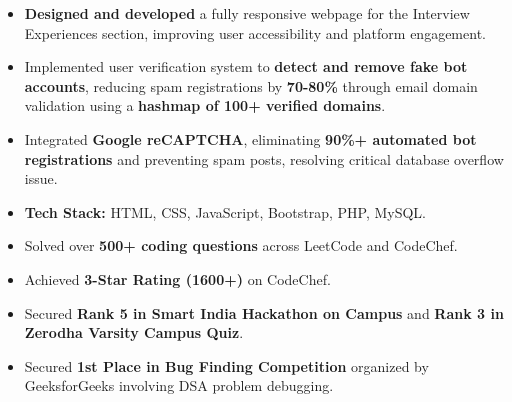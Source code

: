 \documentclass[10pt,a4paper,ragged2e]{altacv}
\begin{document}
\begin{itemize}
\item \textbf{Designed and developed} a fully responsive webpage for the Interview Experiences section, improving user accessibility and platform engagement.
\smallskip
\item Implemented user verification system to \textbf{detect and remove fake bot accounts}, reducing spam registrations by \textbf{70-80\%} through email domain validation using a \textbf{hashmap of 100+ verified domains}.
\smallskip
\item Integrated \textbf{Google reCAPTCHA}, eliminating \textbf{90\%+ automated bot registrations} and preventing spam posts, resolving critical database overflow issue.
\smallskip
\item \textbf{Tech Stack:} HTML, CSS, JavaScript, Bootstrap, PHP, MySQL.
\end{itemize}

\divider

\smallskip
\begin{itemize}
\item Solved over \textbf{500+ coding questions} across LeetCode and CodeChef.
\smallskip
\item Achieved \textbf{3-Star Rating (1600+)} on CodeChef.
\smallskip
\item Secured \textbf{Rank 5 in Smart India Hackathon on Campus} and \textbf{Rank 3 in Zerodha Varsity Campus Quiz}.
\smallskip
\item Secured \textbf{1st Place in Bug Finding Competition} organized by GeeksforGeeks involving DSA problem debugging.\\
\end{itemize}
\end{document}
